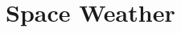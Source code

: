 \documentclass[11pt,a4paper,onecolumn]{report}
\begin{document}















\section{Space Weather}
\end{document}
